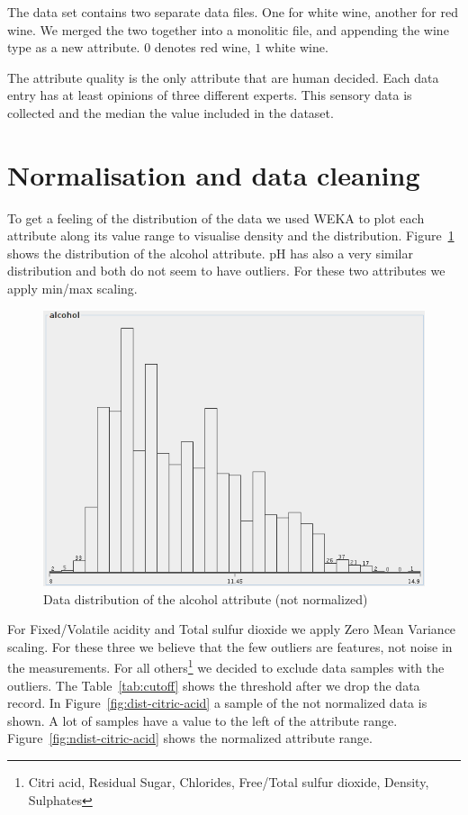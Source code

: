 \documentclass{acm_proc_article-sp}
\begin{document}
The data set contains two separate data files. One for white wine,
another for red wine. We merged the two together into a monolitic file,
and appending the wine type as a new attribute. $0$ denotes red wine, $1$ white wine.

The attribute quality is the only attribute that are human decided.
Each data entry has at least opinions of three different experts. This
sensory data is collected and the median the value included in the
dataset.

\section{Normalisation and data cleaning}

To get a feeling of the distribution of the data we used
WEKA to plot each attribute along its value range to visualise
density and the distribution.
Figure~\ref{fig:dist-alcohol} shows the distribution of the alcohol attribute. pH has
also a very similar distribution and both do not seem to have outliers.
For these two attributes we apply min/max scaling.

\begin{figure}
\centering
\includegraphics[width=0.6\linewidth]{img/dist-alcohol}
\caption{Data distribution of the alcohol attribute (not normalized)}
\label{fig:dist-alcohol}
\end{figure}


For Fixed/Volatile acidity and Total sulfur dioxide we apply Zero Mean Variance scaling. For these three we 
believe that the few outliers are features, not noise in the measurements.
For all others\footnote{Citri acid, Residual Sugar, Chlorides, Free/Total sulfur dioxide, Density, Sulphates}
we decided to exclude data samples with the outliers. The Table~\ref{tab:cutoff} shows the threshold after we drop
the data record. In Figure~\ref{fig:dist-citric-acid} a sample of the not normalized data is shown. A lot
of samples have a value to the left of the attribute range. Figure~\ref{fig:ndist-citric-acid} shows the
normalized attribute range.
\end{document}
